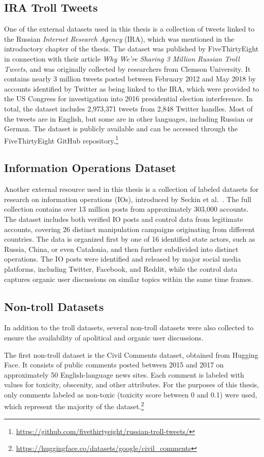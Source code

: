 \documentclass[twoside]{ctuthesis}
\theoremstyle{plain}
\theoremstyle{definition}
\theoremstyle{note}
\begin{document}
\subsection{IRA Troll Tweets}
One of the external datasets used in this thesis is a collection of tweets linked to the Russian \textit{Internet Research Agency} (IRA), which was mentioned in the introductory chapter of the thesis. The dataset was published by FiveThirtyEight in connection with their article \textit{Why We're Sharing 3 Million Russian Troll Tweets}, and was originally collected by researchers from Clemson University. It contains nearly 3 million tweets posted between February 2012 and May 2018 by accounts identified by Twitter as being linked to the IRA, which were provided to the US Congress for investigation into 2016 presidential election interference. In total, the dataset includes 2,973,371 tweets from 2,848 Twitter handles. Most of the tweets are in English, but some are in other languages, including Russian or German. The dataset is publicly available and can be accessed through the FiveThirtyEight GitHub repository.\footnote{\url{https://github.com/fivethirtyeight/russian-troll-tweets/}}

\subsection{Information Operations Dataset}
Another external resource used in this thesis is a collection of labeled datasets for research on information operations (IOs), introduced by Seckin et al.~\cite{Seckin2024}. The full collection contains over 13 million posts from approximately 303,000 accounts. The dataset includes both verified IO posts and control data from legitimate accounts, covering 26 distinct manipulation campaigns originating from different countries. The data is organized first by one of 16 identified state actors, such as Russia, China, or even Catalonia, and then further subdivided into distinct operations. The IO posts were identified and released by major social media platforms, including Twitter, Facebook, and Reddit, while the control data captures organic user discussions on similar topics within the same time frames.\par

\subsection{Non-troll Datasets}
In addition to the troll datasets, several non-troll datasets were also collected to ensure the availability of apolitical and organic user discussions.\par
The first non-troll dataset is the Civil Comments dataset, obtained from Hugging Face. It consists of public comments posted between 2015 and 2017 on approximately 50 English-language news sites. Each comment is labeled with values for toxicity, obscenity, and other attributes. For the purposes of this thesis, only comments labeled as non-toxic (toxicity score between 0 and 0.1) were used, which represent the majority of the dataset.\footnote{\url{https://huggingface.co/datasets/google/civil_comments}}\par
\end{document}
